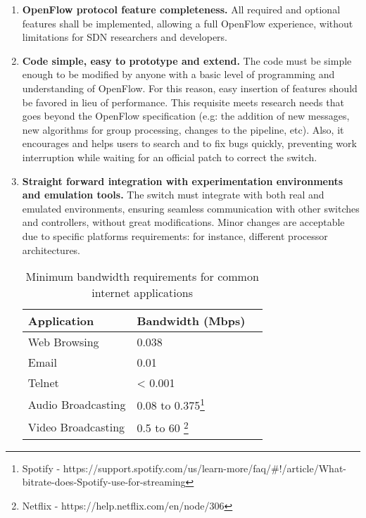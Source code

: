 \begin{enumerate}

\item  \textbf{OpenFlow protocol feature completeness.} All required and optional features shall be implemented, allowing a full OpenFlow experience, without limitations for SDN researchers and developers.   

\item  \textbf{Code simple, easy to prototype and extend.} The code must be simple enough to be modified by anyone with a basic level of programming and understanding of OpenFlow. For this reason, easy insertion of features should be favored in lieu of performance. This requisite meets research needs that goes beyond the OpenFlow specification (e.g: the addition of new messages, new algorithms for group processing, changes to the pipeline, etc). Also, it encourages and helps users to search and to fix bugs quickly, preventing work interruption while waiting for an official patch to correct the switch.       

\item  \textbf{Straight forward integration with experimentation environments and emulation tools.} The switch must integrate with both real and emulated environments, ensuring seamless communication with other switches and controllers, without great modifications. Minor changes are acceptable due to specific platforms requirements: for instance, different processor architectures.

\begin{savenotes}
    \begin{table}[h!]
    \centering
    \caption{Minimum bandwidth requirements for common internet applications}
    \label{tab:appband}
    \begin{tabular}{|l|l|l|}
    \hline
    \textbf{Application}          & \textbf{Bandwidth (Mbps)}                         \\ \hline
    Web Browsing                      & 0.038                                        \\ \hline
    Email                             & 0.01                                          \\ \hline
    Telnet                            & < 0.001                                          \\ \hline
    Audio Broadcasting                & 0.08 to 0.375\footnote{Spotify - https://support.spotify.com/us/learn-more/faq/\#!/article/What-bitrate-does-Spotify-use-for-streaming}                                          \\ \hline
    Video Broadcasting                & 0.5 to 60 \footnote{Netflix - https://help.netflix.com/en/node/306}                                          \\ \hline
    

\end{tabular}
\end{table}
\end{savenotes}
\end{enumerate}
